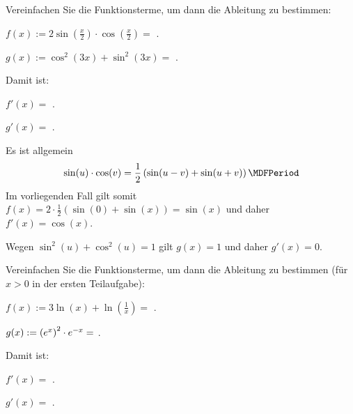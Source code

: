 \begin{MExercises}
\begin{MExercise}
Vereinfachen Sie die Funktionsterme, um dann die Ableitung zu bestimmen:
\begin{MExerciseItems}
\item
 $f(x) := 2 \sin\left(\frac{x}{2}\right) \cdot \cos\left(\frac{x}{2}\right) = $ %
.
\item $g(x) := \cos^2(3 x) + \sin^2(3 x) = $ %
.
\end{MExerciseItems}
Damit ist:
\begin{MExerciseItems}
\item $f'(x) = $ .
\item $g'(x) = $ .
\end{MExerciseItems}
\begin{MHint}{\iSolution}
 \begin{MExerciseItems}
  \item Es ist allgemein
  \[
   \sin (u) \cdot \cos (v) = \frac12 \left( \sin (u-v) + \sin (u+v) \right) \MDFPeriod
  \]
  Im vorliegenden Fall gilt somit $f(x) = 2 \cdot \frac12 ( \sin(0) + \sin(x) ) = \sin (x)$ und daher $f'(x) =  \cos (x)$.
  \item Wegen $\sin^2 (u) + \cos^2 (u) = 1$ gilt $g(x) = 1$ und daher $g'(x) = 0$.
 \end{MExerciseItems}
\end{MHint}
\end{MExercise}

\begin{MExercise}
Vereinfachen Sie die Funktionsterme, um dann die Ableitung zu bestimmen
(für $x > 0$ in der ersten Teilaufgabe):
\begin{MExerciseItems}
\item $f(x) := 3 \ln(x) + \ln\left(\frac{1}{x}\right) = $
.
\item $g(x) := \left(e^x\right)^2 \cdot e^{-x} = $
.
\end{MExerciseItems}
Damit ist:
\begin{MExerciseItems}
\item $f'(x) = $ .
\item $g'(x) = $ .
\end{MExerciseItems}


\end{MExercise}
\end{MExercises}
